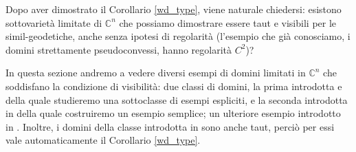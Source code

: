 Dopo aver dimostrato il Corollario \ref{wd_type}, viene naturale chiedersi: esistono sottovarietà limitate di $\mathbb{C}^n$ che possiamo dimostrare essere taut e visibili per le simil-geodetiche, anche senza ipotesi di regolarità (l'esempio che già conosciamo, i domini strettamente pseudoconvessi, hanno regolarità $C^2$)?

In questa sezione andremo a vedere diversi esempi di domini limitati in $\mathbb{C}^n$ che soddisfano la condizione di visibilità: due classi di domini, la prima introdotta \cite{BZ1} e della quale studieremo una sottoclasse di esempi espliciti, e la seconda introdotta in \cite{BM} della quale costruiremo un esempio semplice; un ulteriore esempio introdotto in \cite{CMS}. Inoltre, i domini della classe introdotta in \cite{BM} sono anche taut, perciò per essi vale automaticamente il Corollario \ref{wd_type}.